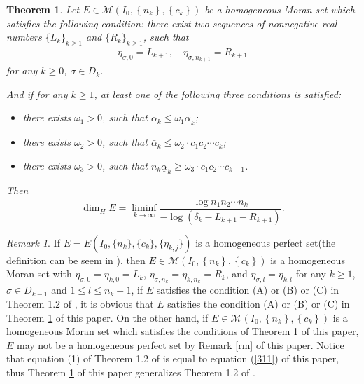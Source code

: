 \documentclass[reqno]{amsart}
\theoremstyle{plain}
\newtheorem{thm}{Theorem}
\theoremstyle{definition}
\theoremstyle{remark}
\newtheorem{rem}{Remark}
\numberwithin{equation}{section} \DeclareMathOperator\intr{int}
\begin{document}
\begin{thm}\label{thm}
    Let
	$E\in \mathcal{M}(I_{0},\left\{n_{k}\right\},\left\{c_{k}\right\})$ be a homogeneous Moran set which satisfies the following condition:
there exist two sequences of nonnegative real numbers $\{L_k\}_{k\ge1}$ and $\{R_k\}_{k\ge 1}$, such that
\begin{equation}
 \begin{aligned}
    \eta_{\sigma,0}=L_{k+1},\quad
    \eta_{\sigma,n_{k+1}}=R_{k+1} \nonumber
 \end{aligned}
 \end{equation}
 for any $k\ge 0$, $\sigma\in D_{k}$.

And if for any $k\ge 1$, at least one of the following three conditions is satisfied:
\begin{itemize}
  \item[(A)]there exists $\omega_1>0$, such that $\bar\alpha_k\le \omega_1 \underline\alpha_k$;
  \item[(B)]there exists $\omega_2>0$, such that $\bar\alpha_k\le \omega_2\cdot c_1c_2\cdots c_k$;
  \item[(C)]there exists $\omega_3>0$, such that $n_k\underline\alpha_k\ge \omega_3\cdot c_1c_2\cdots c_{k-1}$.
\end{itemize}

Then
\begin{equation}\label{311}
\dim_HE=\liminf\limits_{k \to\infty}  \frac{\log n_1n_2\cdots n_k}{-\log(\delta_k-L_{k+1}-R_{k+1})}.
\end{equation}
\end{thm}




\begin{rem}\label{rm1}
 If $E=E(I_{0},\{n_{k}\}, \{c_{k}\},\{\eta_{k,j}\})$ is a homogeneous perfect set(the definition can be seem in \cite{wzywuj05}),  then $E\in \mathcal{M}(I_{0},\left\{n_{k}\right\},\left\{c_{k}\right\})$  is a homogeneous Moran set with $\eta_{\sigma,0}=\eta_{k,0}=L_{k}$, $\eta_{\sigma,n_k}=\eta_{k,n_k}=R_{k}$, and $\eta_{\sigma,l}=\eta_{k,l}$ for any $k\ge 1$, $\sigma\in D_{k-1}$ and $1\le l\le n_k-1$, if  $E$ satisfies the condition (A) or (B) or (C) in Theorem 1.2 of \cite{wzywuj05}, it is obvious that $E$ satisfies the condition (A) or (B) or (C) in Theorem \ref{thm} of this paper. On the other hand, if $E\in \mathcal{M}(I_{0},\left\{n_{k}\right\},\left\{c_{k}\right\})$  is a homogeneous Moran set which satisfies the conditions of Theorem \ref{thm} of this paper, $E$ may not be a homogeneous perfect set by Remark \ref{rm} of this paper. Notice that equation (1) of Theorem 1.2 of \cite{wzywuj05} is equal to equation (\ref{311}) of this paper, thus Theorem \ref{thm} of this paper generalizes Theorem 1.2 of \cite{wzywuj05}.
\end{rem}
\end{document}
